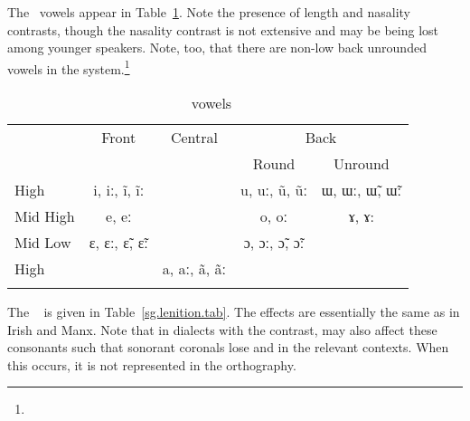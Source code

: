\documentclass[output=paper,colorlinks,citecolor=brown]{langscibook}
\begin{document}
The \sg\ vowels appear in Table~\ref{sg.vowels.tab}. Note the presence of length and nasality contrasts, though the nasality contrast is not extensive and may be being lost among younger speakers. Note, too, that there are non-low back unrounded vowels in the system.\footnote{}

\begin{table}
\caption{\sg\ vowels}
\label{sg.vowels.tab}
\begin{tabular}[t]{lcccc}
\lsptoprule
         & Front        & Central      & \multicolumn{2}{c}{Back} \\\cmidrule(lr){4-5}
         &              &              & Round      & Unround \\
\midrule
High     & i, iː, ĩ, ĩː &              & u, uː, ũ, ũː & ɯ, ɯː, ɯ̃, ɯ̃ː \\
Mid High & e, eː        &              & o, oː        & ɤ, ɤ: \\
Mid Low  & ɛ, ɛː, ɛ̃, ɛ̃ː &              & ɔ, ɔː, ɔ̃, ɔ̃ː & \\
High     &              & a, aː, ã, ãː &              &  \\
\lspbottomrule
\end{tabular}
\end{table}

The \sg\  \m{} is given in Table~\ref{sg.lenition.tab}. The effects are essentially the same as in Irish and Manx. Note that in dialects with the  contrast,  may also affect these consonants such that sonorant coronals lose  and  in the relevant contexts. When this occurs, it is not represented in the orthography.
\end{document}
